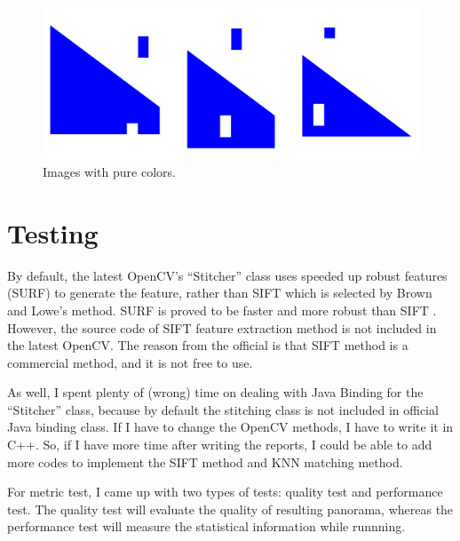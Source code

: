\documentclass[10pt,twocolumn,letterpaper]{article}
\begin{document}
\begin{figure}[t]
    \begin{center}
        \includegraphics[width=0.9\linewidth]{pure_color}
    \end{center}
    \caption{Images with pure colors.}
    \label{fig:pc}
\end{figure}


\section{Testing}
By default, the latest OpenCV's ``Stitcher'' class uses speeded up robust features (SURF) \cite{surf} to generate the feature,
rather than SIFT which is selected by Brown and Lowe's method.
SURF is proved to be faster and more robust than SIFT \cite{cmp}.
However, the source code of SIFT feature extraction method is not included in the latest OpenCV.
The reason from the official \cite{cvcontri} is that SIFT method is a commercial method, and it is not free to use.

As well, I spent plenty of (wrong) time on dealing with Java Binding for the ``Stitcher'' class,
because by default the stitching class is not included in official Java binding class.
If I have to change the OpenCV methods, I have to write it in C++.
So, if I have more time after writing the reports, I could be able to add more codes to implement the SIFT method and KNN matching method.

For metric test, I came up with two types of tests: quality test and performance test.
The quality test will evaluate the quality of resulting panorama, whereas the performance test will measure the statistical information while runnning.
\end{document}
